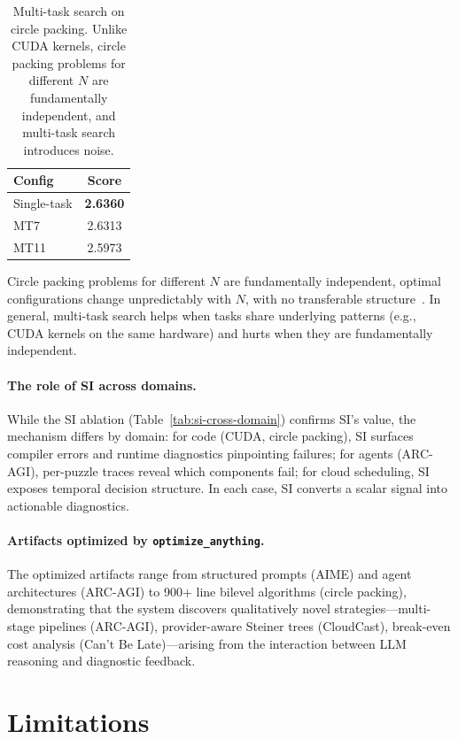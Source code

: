 \documentclass[sigconf]{acmart}
\newcommand{\oa}{\texttt{optimize\_anything}}
\newcommand{\asi}{SI}
\begin{document}
\begin{table}[t]
\caption{Multi-task search on circle packing. Unlike CUDA kernels, circle packing problems for different $N$ are fundamentally independent, and multi-task search introduces noise.}
\label{tab:mt-circle-hurt}
\small
\begin{tabular}{@{}lc@{}}
\toprule
\textbf{Config} & \textbf{Score} \\
\midrule
Single-task & \textbf{2.6360} \\
MT7  & 2.6313 \\
MT11 & 2.5973 \\
\bottomrule
\end{tabular}
\end{table}

Circle packing problems for different $N$ are fundamentally independent, optimal configurations change unpredictably with $N$, with no transferable structure~\cite{graham1996dense,galiev2013linear}. In general, multi-task search helps when tasks share underlying patterns (e.g., CUDA kernels on the same hardware) and hurts when they are fundamentally independent.

\paragraph{The role of \asi{} across domains.}
While the SI ablation (Table~\ref{tab:si-cross-domain}) confirms SI's value, the mechanism differs by domain: for code (CUDA, circle packing), SI surfaces compiler errors and runtime diagnostics pinpointing failures; for agents (ARC-AGI), per-puzzle traces reveal which components fail; for cloud scheduling, SI exposes temporal decision structure. In each case, SI converts a scalar signal into actionable diagnostics.

\paragraph{Artifacts optimized by \oa{}.}
The optimized artifacts range from structured prompts (AIME) and agent architectures (ARC-AGI) to 900+ line bilevel algorithms (circle packing), demonstrating that the system discovers qualitatively novel strategies---multi-stage pipelines (ARC-AGI), provider-aware Steiner trees (CloudCast), break-even cost analysis (Can't Be Late)---arising from the interaction between LLM reasoning and diagnostic feedback.

\section{Limitations}\label{sec:limitations}
\end{document}
